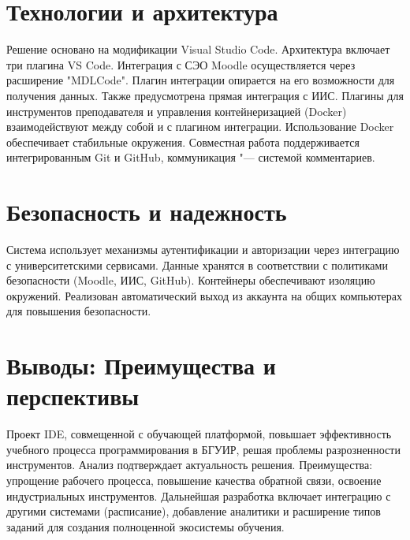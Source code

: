 \documentclass{bsuir}
\begin{document}
\section{Технологии и архитектура}
Решение основано на модификации Visual Studio Code. Архитектура включает три
плагина VS Code. Интеграция с СЭО Moodle осуществляется через расширение
"MDLCode". Плагин интеграции опирается на его возможности для получения данных.
Также предусмотрена прямая интеграция с ИИС. Плагины для инструментов
преподавателя и управления контейнеризацией (Docker) взаимодействуют между собой
и с плагином интеграции. Использование Docker обеспечивает стабильные окружения.
Совместная работа поддерживается интегрированным Git и GitHub, коммуникация "---
системой комментариев.

\section{Безопасность и надежность}
Система использует механизмы аутентификации и авторизации через интеграцию с
университетскими сервисами. Данные хранятся в соответствии с политиками
безопасности (Moodle, ИИС, GitHub). Контейнеры обеспечивают изоляцию окружений.
Реализован автоматический выход из аккаунта на общих компьютерах для повышения
безопасности.

\section{Выводы: Преимущества и перспективы}

Проект IDE, совмещенной с обучающей платформой, повышает эффективность учебного
процесса программирования в БГУИР, решая проблемы разрозненности инструментов.
Анализ подтверждает актуальность решения. Преимущества: упрощение рабочего
процесса, повышение качества обратной связи, освоение индустриальных
инструментов. Дальнейшая разработка включает интеграцию с другими системами
(расписание), добавление аналитики и расширение типов заданий для создания
полноценной экосистемы обучения.
\end{document}
